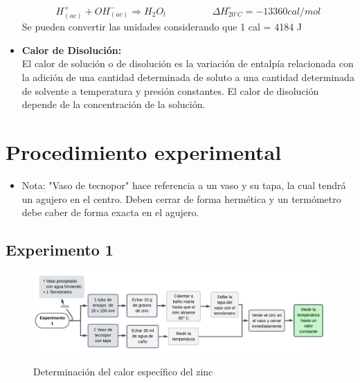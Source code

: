 \documentclass[10pt]{article}
\begin{document}
\begin{itemize}
\begin{equation*}
    H^{+}_{(ac)}+OH^{-}_{(ac)} \Longrightarrow H_{2}O_{l}
    \hspace{2cm}
    \Delta H ^\circ_{20 ^\circ C}= - 13 360 cal/mol
\end{equation*}
Se pueden convertir las unidades considerando que 1 cal = 4184 J
\vspace{2mm}

\item \textbf{Calor de Disolución:}\\[2mm]
El calor de solución o de disolución es la variación de entalpía relacionada con la adición
de una cantidad determinada de soluto a una cantidad determinada de solvente a
temperatura y presión constantes.
El calor de disolución depende de la concentración de la solución.
\end{itemize}

\section{Procedimiento experimental}
\begin{itemize}
    \item Nota: "Vaso de tecnopor" hace referencia a un vaso y su tapa, la cual tendrá un agujero en el centro. Deben 
    cerrar de forma hermética y un termómetro debe caber de forma exacta en el agujero.
\end{itemize}

\subsection{Experimento 1}
    \begin{figure}[H]
	\begin{center}
         \caption{Determinación del calor específico del zinc}  {\label{fig:exp1}} 
        \includegraphics[width = 1\textwidth]{Imagenes/Exp1.png}
	\end{center}
    \end{figure}
    
\end{document}
